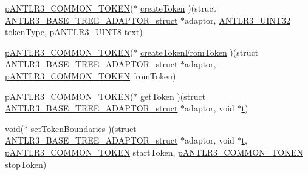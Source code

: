 \begin{DoxyCompactItemize}
\item 
\hyperlink{antlr3interfaces_8h_adaa6df9cbf0cd7ab37fd545520ff299b}{p\-A\-N\-T\-L\-R3\-\_\-\-C\-O\-M\-M\-O\-N\-\_\-\-T\-O\-K\-E\-N}($\ast$ \hyperlink{struct_a_n_t_l_r3___b_a_s_e___t_r_e_e___a_d_a_p_t_o_r__struct_a3e359b0c51e9b5279b0a19c1fd90f901}{create\-Token} )(struct \hyperlink{struct_a_n_t_l_r3___b_a_s_e___t_r_e_e___a_d_a_p_t_o_r__struct}{A\-N\-T\-L\-R3\-\_\-\-B\-A\-S\-E\-\_\-\-T\-R\-E\-E\-\_\-\-A\-D\-A\-P\-T\-O\-R\-\_\-struct} $\ast$adaptor, \hyperlink{antlr3defs_8h_ac41f744abd0fd25144b9eb9d11b1dfd1}{A\-N\-T\-L\-R3\-\_\-\-U\-I\-N\-T32} token\-Type, \hyperlink{antlr3defs_8h_a95c800abcac5d607fd9e3e775ace78c5}{p\-A\-N\-T\-L\-R3\-\_\-\-U\-I\-N\-T8} text)
\item 
\hyperlink{antlr3interfaces_8h_adaa6df9cbf0cd7ab37fd545520ff299b}{p\-A\-N\-T\-L\-R3\-\_\-\-C\-O\-M\-M\-O\-N\-\_\-\-T\-O\-K\-E\-N}($\ast$ \hyperlink{struct_a_n_t_l_r3___b_a_s_e___t_r_e_e___a_d_a_p_t_o_r__struct_abc1148f930c87a16d569b99b2d3c3774}{create\-Token\-From\-Token} )(struct \hyperlink{struct_a_n_t_l_r3___b_a_s_e___t_r_e_e___a_d_a_p_t_o_r__struct}{A\-N\-T\-L\-R3\-\_\-\-B\-A\-S\-E\-\_\-\-T\-R\-E\-E\-\_\-\-A\-D\-A\-P\-T\-O\-R\-\_\-struct} $\ast$adaptor, \hyperlink{antlr3interfaces_8h_adaa6df9cbf0cd7ab37fd545520ff299b}{p\-A\-N\-T\-L\-R3\-\_\-\-C\-O\-M\-M\-O\-N\-\_\-\-T\-O\-K\-E\-N} from\-Token)
\item 
\hyperlink{antlr3interfaces_8h_adaa6df9cbf0cd7ab37fd545520ff299b}{p\-A\-N\-T\-L\-R3\-\_\-\-C\-O\-M\-M\-O\-N\-\_\-\-T\-O\-K\-E\-N}($\ast$ \hyperlink{struct_a_n_t_l_r3___b_a_s_e___t_r_e_e___a_d_a_p_t_o_r__struct_a9f1ab1adf9391972896a81b06f61314c}{get\-Token} )(struct \hyperlink{struct_a_n_t_l_r3___b_a_s_e___t_r_e_e___a_d_a_p_t_o_r__struct}{A\-N\-T\-L\-R3\-\_\-\-B\-A\-S\-E\-\_\-\-T\-R\-E\-E\-\_\-\-A\-D\-A\-P\-T\-O\-R\-\_\-struct} $\ast$adaptor, void $\ast$\hyperlink{showimage_8m_ad941f6ef920fbfb3d75b60ddbedbdd39}{t})
\item 
void($\ast$ \hyperlink{struct_a_n_t_l_r3___b_a_s_e___t_r_e_e___a_d_a_p_t_o_r__struct_a755525c8083b5c2b696551ab33978240}{set\-Token\-Boundaries} )(struct \hyperlink{struct_a_n_t_l_r3___b_a_s_e___t_r_e_e___a_d_a_p_t_o_r__struct}{A\-N\-T\-L\-R3\-\_\-\-B\-A\-S\-E\-\_\-\-T\-R\-E\-E\-\_\-\-A\-D\-A\-P\-T\-O\-R\-\_\-struct} $\ast$adaptor, void $\ast$\hyperlink{showimage_8m_ad941f6ef920fbfb3d75b60ddbedbdd39}{t}, \hyperlink{antlr3interfaces_8h_adaa6df9cbf0cd7ab37fd545520ff299b}{p\-A\-N\-T\-L\-R3\-\_\-\-C\-O\-M\-M\-O\-N\-\_\-\-T\-O\-K\-E\-N} start\-Token, \hyperlink{antlr3interfaces_8h_adaa6df9cbf0cd7ab37fd545520ff299b}{p\-A\-N\-T\-L\-R3\-\_\-\-C\-O\-M\-M\-O\-N\-\_\-\-T\-O\-K\-E\-N} stop\-Token)

\end{DoxyCompactItemize}
